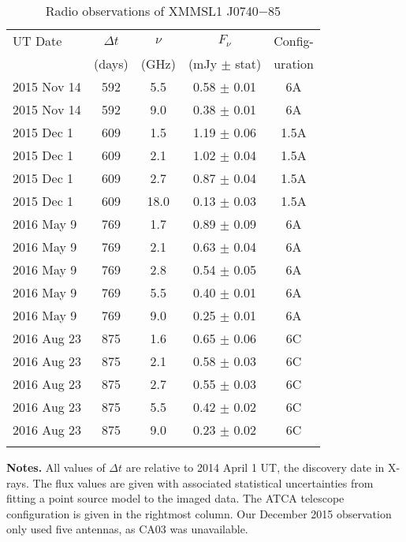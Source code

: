 \begin{table}
\setlength\LTcapwidth{2.5in}
\caption{\label{tab:obs}Radio observations of XMMSL1 J0740$-$85}
\begin{tabular}{lcccc}
\hline
\hline\noalign{\smallskip}
UT Date & $\Delta t$ & $\nu$ & $F_\nu$ & Config- \\
             & (days)         & (GHz)  & (mJy $\pm$ stat) & uration\\ 
\hline\noalign{\smallskip}
2015 Nov 14 & 592 & 5.5 & 0.58 $\pm$ 0.01 & 6A \\
2015 Nov 14 & 592 & 9.0 & 0.38 $\pm$ 0.01 & 6A \\
\hline\noalign{\smallskip}
2015 Dec 1 & 609 & 1.5 & 1.19 $\pm$ 0.06 & 1.5A \\ 
2015 Dec 1 & 609 & 2.1 & 1.02 $\pm$ 0.04 & 1.5A \\ 
2015 Dec 1 & 609 & 2.7 & 0.87 $\pm$ 0.04 & 1.5A \\ 
2015 Dec 1 & 609 & 18.0 & 0.13 $\pm$ 0.03 & 1.5A \\ 
\hline\noalign{\smallskip}
2016 May 9 & 769 & 1.7 & 0.89 $\pm$ 0.09 & 6A \\ 
2016 May 9 & 769 & 2.1 & 0.63 $\pm$ 0.04 & 6A \\ 
2016 May 9 & 769 & 2.8 & 0.54 $\pm$ 0.05 & 6A \\ 
2016 May 9 & 769 & 5.5 & 0.40 $\pm$ 0.01 & 6A \\ 
2016 May 9 & 769 & 9.0 & 0.25 $\pm$ 0.01 & 6A \\ 
\hline\noalign{\smallskip}
2016 Aug 23 & 875 & 1.6 & 0.65 $\pm$ 0.06 & 6C \\ 
2016 Aug 23 & 875 & 2.1 & 0.58 $\pm$ 0.03 & 6C \\
2016 Aug 23 & 875 & 2.7 & 0.55 $\pm$ 0.03 & 6C \\
2016 Aug 23 & 875 & 5.5 & 0.42 $\pm$ 0.02 & 6C \\
2016 Aug 23 & 875 & 9.0 & 0.23 $\pm$ 0.02 & 6C \\
\hline\noalign{\smallskip}
\end{tabular}
{\bf Notes.} All values of $\Delta t$ are relative to 2014 April 1 UT, the discovery date in X-rays. The flux values are given with associated statistical uncertainties from fitting a point source model to the imaged data. The ATCA telescope configuration is given in the rightmost column. Our December 2015 observation only used five antennas, as CA03 was unavailable.  
\end{table}
